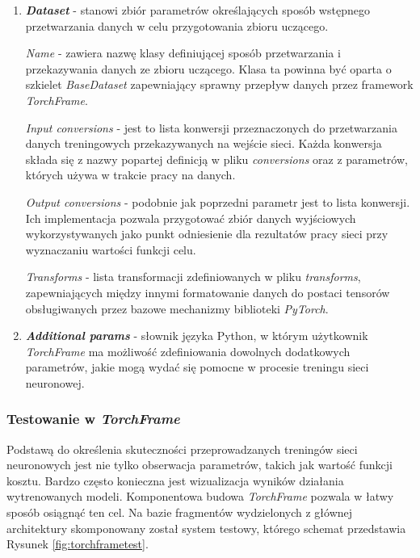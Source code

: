 \begin{enumerate}
    \item \textbf{\textit{Dataset}} - stanowi zbiór parametrów określających sposób
    wstępnego przetwarzania danych w celu przygotowania zbioru uczącego.

    \textit{Name} - zawiera nazwę klasy definiującej sposób przetwarzania
    i przekazywania danych ze zbioru uczącego. Klasa ta powinna być oparta o
    szkielet \textit{BaseDataset} zapewniający sprawny przepływ danych przez framework
    \textit{TorchFrame}.

    \textit{Input conversions} - jest to lista konwersji przeznaczonych do
    przetwarzania danych treningowych przekazywanych na wejście sieci. Każda
    konwersja składa się z nazwy popartej definicją w pliku \textit{conversions} oraz z
    parametrów, których używa w trakcie pracy na danych.

    \textit{Output conversions} - podobnie jak poprzedni parametr jest to lista
    konwersji. Ich implementacja pozwala przygotować zbiór danych wyjściowych
    wykorzystywanych jako punkt odniesienie dla rezultatów pracy sieci przy wyznaczaniu
    wartości funkcji celu.

    \textit{Transforms} - lista transformacji zdefiniowanych w pliku \textit{transforms},
    zapewniających między innymi formatowanie danych do postaci tensorów
    obsługiwanych przez bazowe mechanizmy biblioteki \textit{PyTorch}.

    \item \textbf{\textit{Additional params}} - słownik języka Python, w którym użytkownik
    \textit{TorchFrame} ma możliwość zdefiniowania dowolnych dodatkowych parametrów, jakie
    mogą wydać się pomocne w procesie treningu sieci neuronowej.

    \end{enumerate}

  \subsubsection{Testowanie w \textit{TorchFrame}}
    Podstawą do określenia skuteczności przeprowadzanych treningów sieci neuronowych
    jest nie tylko obserwacja parametrów, takich jak wartość funkcji kosztu. Bardzo
    często konieczna jest wizualizacja wyników działania wytrenowanych modeli.
    Komponentowa budowa \textit{TorchFrame} pozwala w łatwy sposób osiągnąć ten cel.
    Na bazie fragmentów wydzielonych z głównej architektury skomponowany został
    system testowy, którego schemat przedstawia Rysunek \ref{fig:torchframetest}.

